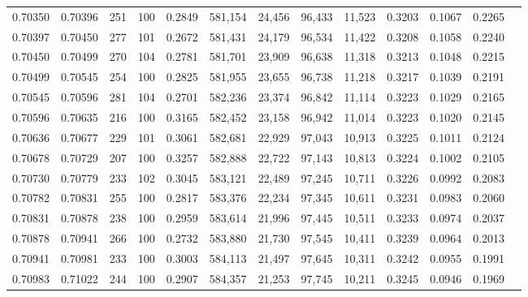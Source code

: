 \begin{tabular}{rrrrrrrrrrrrr}
0.70350 & 0.70396 &   251 & 100 &                                     0.2849 & 581,154 &  24,456 &  96,433 &  11,523 & 0.3203 & 0.1067 & 0.2265 \\
0.70397 & 0.70450 &   277 & 101 &                                     0.2672 & 581,431 &  24,179 &  96,534 &  11,422 & 0.3208 & 0.1058 & 0.2240 \\
0.70450 & 0.70499 &   270 & 104 &                                     0.2781 & 581,701 &  23,909 &  96,638 &  11,318 & 0.3213 & 0.1048 & 0.2215 \\
0.70499 & 0.70545 &   254 & 100 &                                     0.2825 & 581,955 &  23,655 &  96,738 &  11,218 & 0.3217 & 0.1039 & 0.2191 \\
0.70545 & 0.70596 &   281 & 104 &                                     0.2701 & 582,236 &  23,374 &  96,842 &  11,114 & 0.3223 & 0.1029 & 0.2165 \\
0.70596 & 0.70635 &   216 & 100 &                                     0.3165 & 582,452 &  23,158 &  96,942 &  11,014 & 0.3223 & 0.1020 & 0.2145 \\
0.70636 & 0.70677 &   229 & 101 &                                     0.3061 & 582,681 &  22,929 &  97,043 &  10,913 & 0.3225 & 0.1011 & 0.2124 \\
0.70678 & 0.70729 &   207 & 100 &                                     0.3257 & 582,888 &  22,722 &  97,143 &  10,813 & 0.3224 & 0.1002 & 0.2105 \\
0.70730 & 0.70779 &   233 & 102 &                                     0.3045 & 583,121 &  22,489 &  97,245 &  10,711 & 0.3226 & 0.0992 & 0.2083 \\
0.70782 & 0.70831 &   255 & 100 &                                     0.2817 & 583,376 &  22,234 &  97,345 &  10,611 & 0.3231 & 0.0983 & 0.2060 \\
0.70831 & 0.70878 &   238 & 100 &                                     0.2959 & 583,614 &  21,996 &  97,445 &  10,511 & 0.3233 & 0.0974 & 0.2037 \\
0.70878 & 0.70941 &   266 & 100 &                                     0.2732 & 583,880 &  21,730 &  97,545 &  10,411 & 0.3239 & 0.0964 & 0.2013 \\
0.70941 & 0.70981 &   233 & 100 &                                     0.3003 & 584,113 &  21,497 &  97,645 &  10,311 & 0.3242 & 0.0955 & 0.1991 \\
0.70983 & 0.71022 &   244 & 100 &                                     0.2907 & 584,357 &  21,253 &  97,745 &  10,211 & 0.3245 & 0.0946 & 0.1969 \\

\end{tabular}
